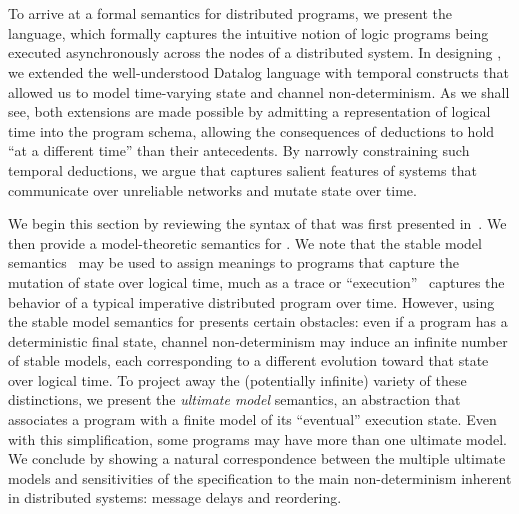 \section{\large \bf \lang}
\label{sec:foundation}

To arrive at a formal semantics for distributed programs, we present the
\lang~\cite{dedalus} language, which formally captures the intuitive notion of
logic programs being executed asynchronously across the nodes of a distributed
system.  In designing \lang, we extended the well-understood Datalog language
with temporal constructs that allowed us to model time-varying state and channel
non-determinism.  As we shall see, both extensions are made possible by
admitting a representation of logical time into the program schema, allowing the
consequences of deductions to hold ``at a different time'' than their
antecedents.  By narrowly constraining such temporal deductions, we argue that
\lang captures salient features of systems that communicate over unreliable
networks and mutate state over time.

We begin this section by reviewing the syntax of \lang that was first presented
in~\cite{dedalus}. We then provide a model-theoretic semantics for \lang.  We
note that the stable model semantics~\cite{stable-model} may be used to assign
meanings to \lang programs that capture the mutation of state over logical time,
much as a trace or ``execution''~\cite{ioa}
captures the behavior of a typical imperative distributed program over time.
However, using the stable model semantics for \lang presents certain obstacles:
even if a \lang program has a deterministic final state, channel non-determinism
may induce an infinite number of stable models, each corresponding to a
different evolution toward that state over logical time.  To project away the
(potentially infinite) variety of these distinctions, we present the {\em
  ultimate model} semantics, an abstraction that associates a program with a
finite model of its ``eventual'' execution state.  Even with this
simplification, some programs may have more than one ultimate model.  We
conclude by showing a natural correspondence between the multiple ultimate
models and sensitivities of the specification to the main non-determinism
inherent in distributed systems: message delays and reordering.


